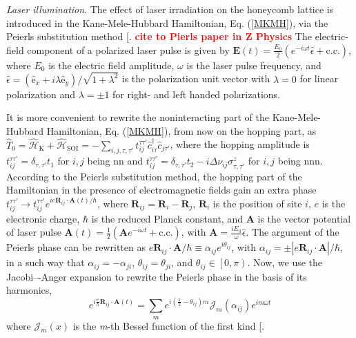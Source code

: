 \documentclass[aps,prl,twocolumn,amsmath,amssymb,nobibnotes]{revtex4-1}%
\renewcommand{\cite}[1]{{[}\onlinecite{#1}{]}}
\newcommand{\bs}{\boldsymbol}
\newcommand{\AQ}[1]{\textbf{\textcolor{red}{{#1}}}}
\begin{document}
\textit{Laser illumination}. The effect of laser irradiation on the honeycomb lattice is introduced in the Kane-Mele-Hubbard Hamiltonian, Eq. (\ref{MKMH}), via the Peierls substitution method \cite{Peierls1933}. \AQ{cite to Pierls paper in Z Physics} The electric-field component of a polarized laser pulse is given by $\bs{E}(t) = \frac{E_0}{2}( e^{-i\omega t}\hat{\epsilon}+\mathrm{c.c.})$, where $E_0$ is the electric field amplitude, $\omega$ is the laser pulse frequency, and $\hat{\epsilon} = (\hat{\mathrm{e}}_x+i\lambda\hat{\mathrm{e}}_y)/\sqrt{1+\lambda^2}$ is the polarization unit vector with $\lambda= 0$ for linear polarization and $\lambda= \pm 1$ for right- and left handed polarizations.

It is more convenient to rewrite the noninteracting part of the Kane-Mele-Hubbard Hamiltonian, Eq. (\ref{MKMH}), from now on the hopping part, as $\hat{T}_0=\hat{\mathcal{H}}_{\text{K}}+\hat{\mathcal{H}}_{\text{SOI}} = - \sum_{i,j , \tau, \tau'}
t_{ij}^{\tau\tau'} \hat{c}_{i \tau}^\dagger \hat{c}_{j \tau'}$, where the hopping amplitude is $t_{ij}^{\tau\tau'} = \delta_{\tau,\tau'}t_1$ for $i,j$ being nn and $t_{ij}^{\tau\tau'} = \delta_{\tau,\tau'}t_2 - i\Delta\nu_{ij}\sigma^z_{\tau, \tau'}$ for $i,j$ being nnn.
According to the Peierls substitution method, the hopping part of the Hamiltonian in the presence of electromagnetic fields gain an extra phase $t_{ij}^{\tau\tau'}\rightarrow t_{ij}^{\tau\tau'} e^{{i e \bs{R}_{ij} \cdot \bs{A}(t)}/\hbar}$, where $\bs{R}_{ij} = \bs{R}_i-\bs{R}_j$, $\bs{R}_i$ is the position of site $i$, $e$ is the electronic charge, $\hbar$ is the reduced Planck constant, and $\bs{A}$ is the vector potential of laser pulse $\bs{A}(t) = \frac{1}{2}(\bs{A} e^{-i\omega t} + \mathrm{c.c.})$, with $\bs{A} = \frac{iE_0}{\omega}\hat{\epsilon}$.
The argument of the Peierls phase can be rewritten as $e\bs{R}_{ij}\cdot\bs{A}/\hbar \equiv \alpha_{ij} e^{i \theta_{ij}}$, with $\alpha_{ij} = \pm|e\bs{R}_{ij}\cdot \bs{A}|/\hbar$, in a such way that $\alpha_{ij}= -\alpha_{ji}$, $\theta_{ij}= \theta_{ji}$, and $\theta_{ij} \in \left[0,\pi\right)$.
Now, we use the Jacobi–-Anger expansion to rewrite the Peierls phase in the basis of its harmonics,
\begin{equation}
\label{JacobiAnger}
e^{i\frac{e}{\hbar}\bs{R}_{ij}\cdot\bs{A}(t)} = \sum_m e^{i(\frac{\pi}{2}-\theta_{ij})m} \mathcal{J}_m(\alpha_{ij}) e^{im\omega t}
\end{equation}
where $\mathcal{J}_m(x)$ is the \textit{m}-th Bessel function of the first kind \cite{Kitamura2017}.
\end{document}
